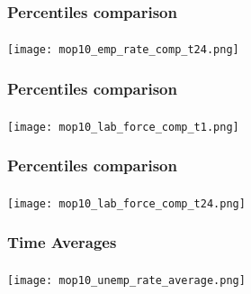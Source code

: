 \begin{frame}

    \label{perc_comparison_21}
    
    \frametitle{Percentiles comparison} %
    \framesubtitle{}  %
    \rmfamily %

    \begin{center}
        \texttt{[image: mop10\_emp\_rate\_comp\_t24.png]}
    \end{center}
    
    \hyperlink{emp_rate_result}{}
    
\end{frame}

\begin{frame}

    \label{perc_comparison_3}
    
    \frametitle{Percentiles comparison} %
    \framesubtitle{}  %
    \rmfamily %

    \begin{center}
        \texttt{[image: mop10\_lab\_force\_comp\_t1.png]}
    \end{center}
    
    \hyperlink{lab_force_rate_result}{}
    
\end{frame}

\begin{frame}

    \label{perc_comparison_31}
    
    \frametitle{Percentiles comparison} %
    \framesubtitle{}  %
    \rmfamily %

    \begin{center}
        \texttt{[image: mop10\_lab\_force\_comp\_t24.png]}
    \end{center}
    
    \hyperlink{lab_force_rate_result}{}
    
\end{frame}

\begin{frame}

    \label{ta_1}
    
    \frametitle{Time Averages} %
    \framesubtitle{}  %
    \rmfamily %

    \begin{center}
        \texttt{[image: mop10\_unemp\_rate\_average.png]}
    \end{center}
    
    \hyperlink{unemp_rate_result}{}
    
\end{frame}

